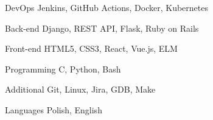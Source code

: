 

\begin{cvskills}

  \cvskill
    {DevOps} %
    {Jenkins, GitHub Actions, Docker, Kubernetes} %

  \cvskill
    {Back-end} %
    {Django, REST API, Flask, Ruby on Rails} %

  \cvskill
    {Front-end} %
    {HTML5, CSS3, React, Vue.js, ELM} %

  \cvskill
    {Programming} %
    {C, Python, Bash} %

  \cvskill
    {Additional} %
    {Git, Linux, Jira, GDB, Make} %

  \cvskill
    {Languages} %
    {Polish, English} %

\end{cvskills}

